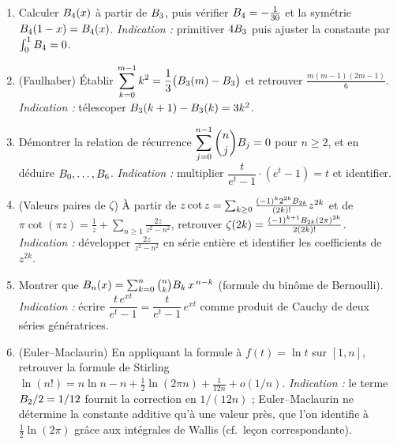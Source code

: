 \begin{mdframed}[style=exobar]
  \begin{enumerate}
    \item Calculer $B_{4}(x)$ à partir de $B_{3}$, puis vérifier
          $B_{4}=-\tfrac{1}{30}$ et la symétrie $B_{4}(1-x)=B_{4}(x)$.
          \textit{Indication :} primitiver $4B_{3}$ puis ajuster la constante
          par $\int_{0}^{1}B_{4}=0$.

    \item (Faulhaber) Établir $\displaystyle\sum_{k=0}^{m-1}k^{2}
          =\frac{1}{3}\bigl(B_{3}(m)-B_{3}\bigr)$ et retrouver
          $\frac{m(m-1)(2m-1)}{6}$. \textit{Indication :} télescoper
          $B_{3}(k+1)-B_{3}(k)=3k^{2}$.

    \item Démontrer la relation de récurrence
          $\displaystyle\sum_{j=0}^{n-1}\binom{n}{j}B_{j}=0$ pour $n\geq 2$,
          et en déduire $B_{0},\dots,B_{6}$. \textit{Indication :}
          multiplier $\dfrac{t}{e^{t}-1}\cdot(e^{t}-1)=t$ et identifier.

    \item (Valeurs paires de $\zeta$) À partir de
          $z\cot z=\sum_{k\geq 0}\frac{(-1)^{k}2^{2k}B_{2k}}{(2k)!}z^{2k}$
          et de $\pi\cot(\pi z)=\frac{1}{z}+\sum_{n\geq 1}\frac{2z}{z^{2}-n^{2}}$,
          retrouver $\zeta(2k)=\frac{(-1)^{k+1}B_{2k}(2\pi)^{2k}}{2(2k)!}$.
          \textit{Indication :} développer $\frac{2z}{z^{2}-n^{2}}$ en série
          entière et identifier les coefficients de $z^{2k}$.

    \item Montrer que $B_{n}(x)=\sum_{k=0}^{n}\binom{n}{k}B_{k}\,x^{\,n-k}$
          (formule du binôme de Bernoulli). \textit{Indication :} écrire
          $\dfrac{t\,e^{xt}}{e^{t}-1}=\dfrac{t}{e^{t}-1}\,e^{xt}$ comme produit de
          Cauchy de deux séries génératrices.

    \item (Euler--Maclaurin) En appliquant la formule à $f(t)=\ln t$ sur
          $[1,n]$, retrouver la formule de Stirling
          $\ln(n!)=n\ln n-n+\tfrac{1}{2}\ln(2\pi n)+\tfrac{1}{12n}+o(1/n)$.
          \textit{Indication :} le terme $B_{2}/2=1/12$ fournit la correction
          en $1/(12n)$ ; Euler--Maclaurin ne détermine la constante additive
          qu'à une valeur près, que l'on identifie à $\tfrac{1}{2}\ln(2\pi)$
          grâce aux intégrales de Wallis (cf.\ leçon correspondante).
  \end{enumerate}
\end{mdframed}


